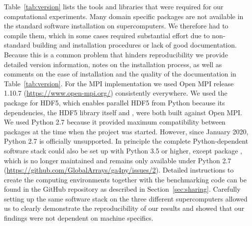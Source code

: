 Table~\ref{tab:version} lists the tools and libraries that were required for our computational experiments.  Many domain specific packages are not available in the standard software installation on supercomputers.
We therefore had to compile them, which in some cases required substantial effort due to non-standard building and installation procedures or lack of good documentation.
Because this is a common problem that hinders reproducibility we provide detailed version information, notes on the installation process, as well as comments on the ease of installation and the quality of the documentation in Table~\ref{tab:version}.
For the MPI implementation we used Open MPI release 1.10.7  (\url{https://www.open-mpi.org/}) consistently everywhere.
We used the  package for HDF5, which enables parallel HDF5 from Python because its dependencies, the HDF5 library itself and , were both built against Open MPI.
We used Python 2.7 because it provided maximum compatibility between packages at the time when the project was started.
However, since January 2020, Python 2.7 is officially unsupported.
In principle the complete Python-dependent software stack could also be set up with Python 3.5 or higher, except package , which is no longer maintained and remains only available under Python 2.7 (\url{https://github.com/GlobalArrays/ga4py/issues/2}).
Detailed instructions to create the computing environments together with the benchmarking code can be found in the GitHub repository as described in Section~\ref{sec:sharing}.
Carefully setting up the same software stack on the three different supercomputers allowed us to clearly demonstrate the reproducibility of our results and showed that our findings were not dependent on machine specifics.


